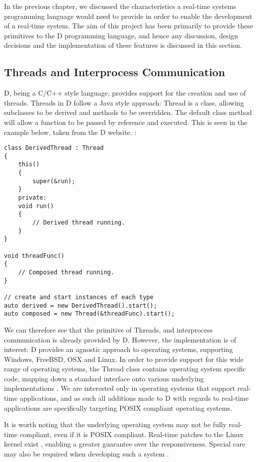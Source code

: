 
In the previous chapter, we discussed the characteristics a real-time 
systems programming language would need to provide in order to enable the 
development of a real-time system. The aim of this project has been primarily to 
provide these primitives to the D programming language, and hence any discussion, 
design decisions and the implementation of these features is discussed in this 
section. 

\subsection{Threads and Interprocess Communication}
D, being a C/C++ style language, provides support for the creation and use of 
threads. Threads in D follow a Java style approach: Thread is a class, 
allowing subclasses to be derived and methods to be overridden. The default 
class method will allow a function to be passed by reference and executed. 
This is seen in the example below, taken from the D website. 
\cite{http://dlang.org/phobos/core_thread.html}: 
\begin{lstlisting}
class DerivedThread : Thread
{
    this()
    {
        super(&run);
    }
    private:
    void run()
    {
        // Derived thread running.
    }
}

void threadFunc()
{
    // Composed thread running.
}

// create and start instances of each type
auto derived = new DerivedThread().start();
auto composed = new Thread(&threadFunc).start();
\end{lstlisting}
We can therefore see that the primitive of Threads, and interprocess communication 
is already provided by D. However, the implementation is of interest: D 
provides an agnostic approach to operating systems, supporting Windows, FreeBSD, 
OSX and Linux. 
In order to provide support for this wide range of operating systems, the Thread 
class contains operating system specific code, mapping down a standard interface 
onto various underlying implementations 
\cite{https://github.com/D-Programming-Language/druntime/blob/master/src/core/thread.d}. 
We are interested only in operating systems 
that support real-time applications, and as such all additions made to D with 
regards to real-time applications are specifically targeting POSIX compliant 
operating systems. 
\par\bigskip\noindent
It is worth noting that the underlying operating system may not be fully
real-time compliant, even if it is POSIX compliant. Real-time patches to the 
Linux kernel exist 
\cite{https://rt.wiki.kernel.org/index.php/Main_Page}, enabling a greater 
guarantee over the responsiveness. Special care may also be required when 
developing such a system 
\cite {https://rt.wiki.kernel.org/index.php/HOWTO:_Build_an_RT-application}. 


